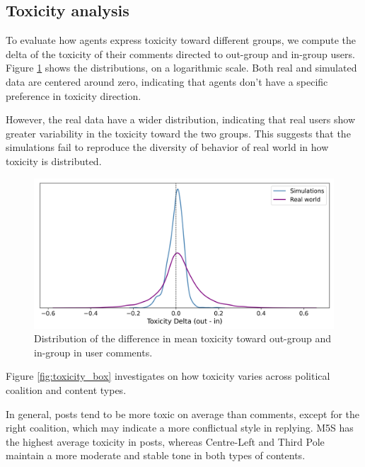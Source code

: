 \subsection{Toxicity analysis}

To evaluate how agents express toxicity toward different groups, we compute the delta of the toxicity of their comments directed to out-group and in-group users.
Figure \ref{fig:toxicity_in_out} shows the distributions, on a logarithmic scale.
Both real and simulated data are centered around zero, indicating that agents don't have a specific preference in toxicity direction.

However, the real data have a wider distribution, indicating that real users show greater variability in the toxicity toward the two groups.
This suggests that the simulations fail to reproduce the diversity of behavior of real world  in how toxicity is distributed.



\begin{figure}[h]
    \centering
    \includegraphics[width=1\linewidth]{Images/Toxicity/diff_in_out_combined.png}
    \caption{Distribution of the difference in mean toxicity toward out-group and in-group in user comments.}
    \label{fig:toxicity_in_out}
\end{figure}


\medskip
Figure \ref{fig:toxicity_box} investigates on how toxicity varies across political coalition and content types.

In general, posts tend to be more toxic on average than comments, except for the right coalition, which may indicate a more conflictual style in replying.
M5S has the highest average toxicity in posts, whereas Centre-Left and Third Pole maintain a more moderate and stable tone in both types of contents.

